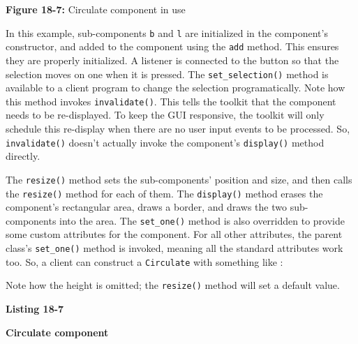 {\sffamily\bfseries Figure 18-7:}
{\sffamily Circulate component in use}

\bigskip

In this example, sub-components \texttt{b} and \texttt{l} are
initialized in the component's constructor, and
added to the component using the \texttt{add} method. This ensures
they are properly initialized. A listener is connected to the button
so that the selection moves on one when it is pressed. The
\texttt{set\_selection()} method is available to a client program to
change the selection programatically. Note how this method invokes
\texttt{invalidate()}. This tells the toolkit that the component
needs to be re-displayed. To keep the GUI responsive, the toolkit
will only schedule this re-display when there are no user input events
to be processed. So, \texttt{invalidate()} doesn't
actually invoke the component's \texttt{display()}
method directly.

The \texttt{resize()} method sets the sub-components'
position and size, and then calls the \texttt{resize()} method for each
of them. The \texttt{display()} method erases the
component's rectangular area, draws a border, and
draws the two sub-components into the area. The \texttt{set\_one()}
method is also overridden to provide some custom attributes for the
component. For all other attributes, the parent
class's \texttt{set\_one()} method is invoked, meaning
all the standard attributes work too. So, a client can construct a
\texttt{Circulate} with something like :


Note how the height is omitted; the \texttt{resize()} method will set a
default value.

\bigskip

{\sffamily\bfseries Listing 18-7}

{\sffamily\bfseries Circulate component}

